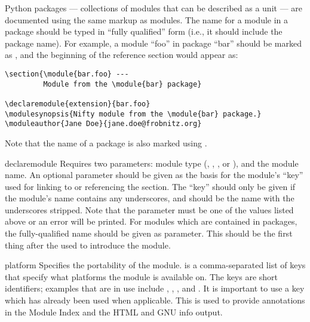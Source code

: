 \documentclass{howto}
\begin{document}
  Python packages --- collections of modules that can
  be described as a unit --- are documented using the same markup as
  modules.  The name for a module in a package should be typed in
  ``fully qualified'' form (i.e., it should include the package name).
  For example, a module ``foo'' in package ``bar'' should be marked as
  , and the beginning of the reference
  section would appear as:

\begin{verbatim}
\section{\module{bar.foo} ---
         Module from the \module{bar} package}

\declaremodule{extension}{bar.foo}
\modulesynopsis{Nifty module from the \module{bar} package.}
\moduleauthor{Jane Doe}{jane.doe@frobnitz.org}
\end{verbatim}

  Note that the name of a package is also marked using
  .

  \begin{macrodesc}{declaremodule}{}
    Requires two parameters: module type (,
    , , or \samp{}), and the module
    name.  An optional parameter should be given as the basis for the
    module's ``key'' used for linking to or referencing the section.
    The ``key'' should only be given if the module's name contains any
    underscores, and should be the name with the underscores stripped.
    Note that the  parameter must be one of the values
    listed above or an error will be printed.  For modules which are
    contained in packages, the fully-qualified name should be given as
     parameter.  This should be the first thing after the
     used to introduce the module.
  \end{macrodesc}

  \begin{macrodesc}{platform}{}
    Specifies the portability of the module.   is a
    comma-separated list of keys that specify what platforms the
    module is available on.  The keys are short identifiers;
    examples that are in use include , ,
    , and .  It is important to use a key
    which has already been used when applicable.  This is used to
    provide annotations in the Module Index and the HTML and GNU info
    output.
  \end{macrodesc}
\end{document}
